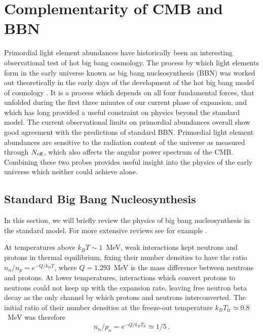 \section{Complementarity of CMB and BBN}



Primordial light element abundances have historically been an interesting observational test of hot big bang cosmology.  The process by which light elements form in the early universe known as big bang nucleosynthesis (BBN) was worked out theoretically in the early days of the development of the hot big bang model of cosmology \cite{Alpher:1948ve}.  It is a process which depends on all four fundamental forces, that unfolded during the first three minutes of our current phase of expansion, and which has long provided a useful constraint on physics beyond the standard model.  The current observational limits on primordial abundances overall show good agreement with the predictions of standard BBN.  Primordial light element abundances are sensitive to the radiation content of the universe as measured through $N_{\rm eff}$, which also affects the angular power spectrum of the CMB.  Combining these two probes provides useful insight into the physics of the early universe which neither could achieve alone.

\subsection{Standard Big Bang Nucleosynthesis} \label{StandardBBN}
In this section, we will briefly review the physics of big bang nucleosynthesis in the standard model.  For more extensive reviews see for example \cite{Weinberg:2008zzc,Agashe:2014kda,Cyburt:2015mya}.

At temperatures above $k_BT\sim 1$~MeV, weak interactions kept neutrons and protons in thermal equilibrium, fixing their number densities to have the ratio $n_n/n_p = e^{-Q/k_BT}$, where $Q = 1.293$~MeV is the mass difference between neutrons and protons.  At lower temperatures, interactions which convert protons to neutrons could not keep up with the expansion rate, leaving free neutron beta decay as the only channel by which protons and neutrons interconverted.  The initial ratio of their number densities at the freeze-out temperature $k_BT_\mathrm{fr}\simeq0.8$~MeV was therefore
\begin{equation}
	n_n/p_n = e^{-Q/k_BT_\mathrm{fr}} \simeq 1/5 \, .
\end{equation}



